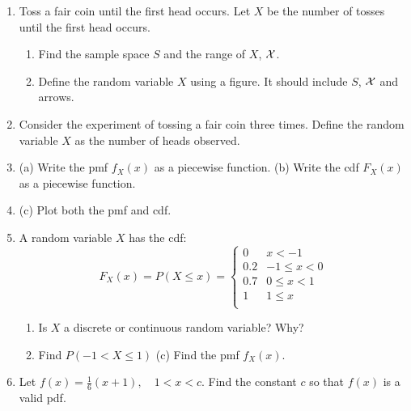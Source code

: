 \documentclass{article}
\begin{document}
\begin{enumerate}
    \item Toss a fair coin until the first head occurs. Let $X$ be the number of tosses until the first head occurs.%
    \begin{enumerate}
        \item Find the sample space $S$ and the range of $X$, $\cal{X}$.\vspace{30pt}
        \item Define the random variable $X$ using a figure. It should include $S$, $\cal{X}$ and arrows.\vspace{60pt}
    \end{enumerate}
    
    \item Consider the experiment of tossing a fair coin three times. Define the random variable $X$ as the number of heads observed.%
    \item[] (a) Write the pmf $f_X(x)$ as a piecewise function. \hspace{20pt} (b) Write the cdf $F_X(x)$ as a piecewise function.\vspace{90pt}
    \item[] (c) Plot both the pmf and cdf.\vspace{100pt}
    
    \item A random variable $X$ has the cdf: %
    \[
    F_X(x) =  P(X \le x) = 
        \left\{
        \begin{array}{ll}
             0 & x < -1\\
             0.2 & -1 \le x < 0\\
             0.7 & 0 \le x < 1\\
             1 & 1 \le x \\
        \end{array}
        \right.
    \]
    \begin{enumerate}
        \item Is $X$ a discrete or continuous random variable? Why?\vspace{30pt}
        \item Find $P(-1 < X \le 1)$ \hspace{50pt} (c) Find the pmf $f_X(x)$.\vspace{50pt}
    \end{enumerate}
        
    \item Let $\displaystyle f(x) = \frac{1}{6} (x+1), \quad 1 < x < c$. Find the constant $c$ so that $f(x)$ is a valid pdf.\vspace{120pt}%
    

\end{enumerate}
\end{document}
